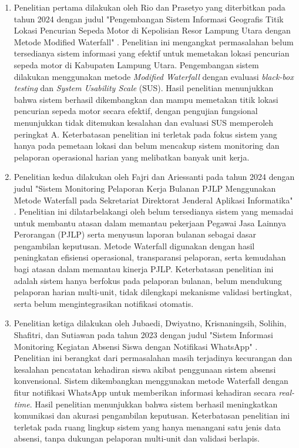 \begin{enumerate}[noitemsep]
    \item Penelitian pertama dilakukan oleh Rio dan Prasetyo yang diterbitkan pada tahun 2024 dengan judul "Pengembangan Sistem Informasi Geografis Titik Lokasi Pencurian Sepeda Motor di Kepolisian Resor Lampung Utara dengan Metode Modified Waterfall" \cite{rio2024gis}. Penelitian ini mengangkat permasalahan belum tersedianya sistem informasi yang efektif untuk memetakan lokasi pencurian sepeda motor di Kabupaten Lampung Utara. Pengembangan sistem dilakukan menggunakan metode \textit{Modified Waterfall} dengan evaluasi \textit{black-box testing} dan \textit{System Usability Scale} (SUS). Hasil penelitian menunjukkan bahwa sistem berhasil dikembangkan dan mampu memetakan titik lokasi pencurian sepeda motor secara efektif, dengan pengujian fungsional menunjukkan tidak ditemukan kesalahan dan evaluasi SUS memperoleh peringkat A. Keterbatasan penelitian ini terletak pada fokus sistem yang hanya pada pemetaan lokasi dan belum mencakup sistem monitoring dan pelaporan operasional harian yang melibatkan banyak unit kerja.

    \item Penelitian kedua dilakukan oleh Fajri dan Ariessanti pada tahun 2024 dengan judul "Sistem Monitoring Pelaporan Kerja Bulanan PJLP Menggunakan Metode Waterfall pada Sekretariat Direktorat Jenderal Aplikasi Informatika" \cite{fajri2024monitoring}. Penelitian ini dilatarbelakangi oleh belum tersedianya sistem yang memadai untuk membantu atasan dalam memantau pekerjaan Pegawai Jasa Lainnya Perorangan (PJLP) serta menyusun laporan bulanan sebagai dasar pengambilan keputusan. Metode Waterfall digunakan dengan hasil peningkatan efisiensi operasional, transparansi pelaporan, serta kemudahan bagi atasan dalam memantau kinerja PJLP. Keterbatasan penelitian ini adalah sistem hanya berfokus pada pelaporan bulanan, belum mendukung pelaporan harian multi-unit, tidak dilengkapi mekanisme validasi bertingkat, serta belum mengintegrasikan notifikasi otomatis.

    \item Penelitian ketiga dilakukan oleh Jubaedi, Dwiyatno, Krisnaningsih, Solihin, Shafitri, dan Sutiawan pada tahun 2023 dengan judul "Sistem Informasi Monitoring Kegiatan Absensi Siswa dengan Notifikasi WhatsApp" \cite{jubaedi2023absensi}. Penelitian ini berangkat dari permasalahan masih terjadinya kecurangan dan kesalahan pencatatan kehadiran siswa akibat penggunaan sistem absensi konvensional. Sistem dikembangkan menggunakan metode Waterfall dengan fitur notifikasi WhatsApp untuk memberikan informasi kehadiran secara \textit{real-time}. Hasil penelitian menunjukkan bahwa sistem berhasil meningkatkan komunikasi dan akurasi pengambilan keputusan. Keterbatasan penelitian ini terletak pada ruang lingkup sistem yang hanya menangani satu jenis data absensi, tanpa dukungan pelaporan multi-unit dan validasi berlapis.


\end{enumerate}
